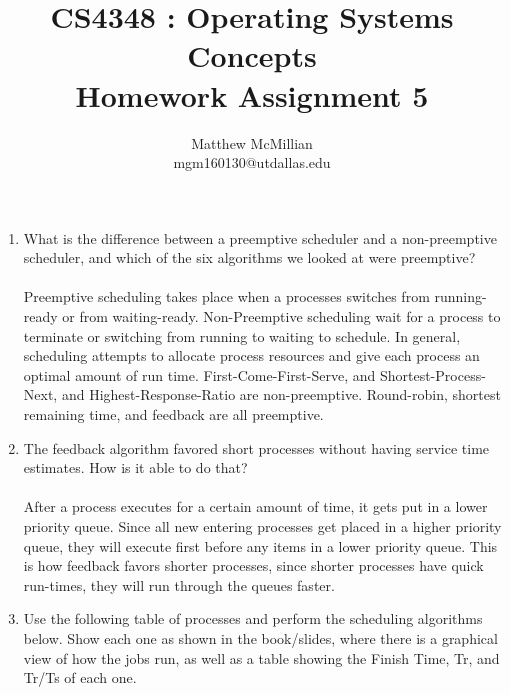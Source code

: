 \documentclass[12pt]{article}
\begin{document}
\title{CS4348 : Operating Systems Concepts\\Homework Assignment 5}
\author{Matthew McMillian\\mgm160130@utdallas.edu}
\maketitle

\begin{enumerate}

	\item What is the difference between a preemptive scheduler and a non-preemptive scheduler, and which of the six algorithms we looked at were preemptive? \\ \\
	Preemptive scheduling takes place when a processes switches from running-ready or from waiting-ready. Non-Preemptive scheduling wait for a process to terminate or switching from running to waiting to schedule. In general, scheduling attempts to allocate process resources and give each process an optimal amount of run time. First-Come-First-Serve, and Shortest-Process-Next, and Highest-Response-Ratio are non-preemptive. Round-robin, shortest remaining time, and feedback are all preemptive.\\
	
	\item The feedback algorithm favored short processes without having service time estimates.  How is it able to do that? \\ \\ 
	After a process executes for a certain amount of time, it gets put in a lower priority queue. Since all new entering processes get placed in a higher priority queue, they will execute first before any items in a lower priority queue. This is how feedback favors shorter processes, since shorter processes have quick run-times, they will run through the queues faster.\\
	\pagebreak  
	\item Use the following table of processes and perform the scheduling algorithms below.
   Show each one as shown in the book/slides, where there is a graphical view of how the jobs run, as well as a table showing the Finish Time, Tr, and Tr/Ts of each one. \\ \\
	 	

\end{enumerate}
\end{document}
